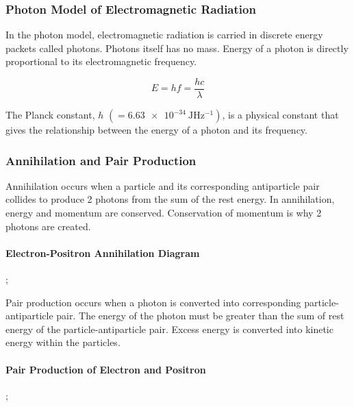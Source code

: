 \documentclass[10pt]{article}
\begin{document}
\begin{multicols*}{2}
	\subsubsection{Photon Model of Electromagnetic Radiation}
	In the photon model, electromagnetic radiation is carried in discrete energy
	packets called photons. Photons itself has no mass. Energy of a photon is
	directly proportional to its electromagnetic frequency.

	\begin{equation}
		E = hf = \dfrac{hc}{\lambda}
	\end{equation}

	The Planck constant, $h$ $(= \qty{6.63e-34}{\joule\hertz^{-1}})$, is a physical
	constant that gives the relationship between the energy of a photon and its
	frequency.

	\subsubsection{Annihilation and Pair Production}
	Annihilation occurs when a particle and its corresponding antiparticle pair
	collides to produce 2 photons from the sum of the rest energy. In annihilation,
	energy and momentum are conserved. Conservation of momentum is why 2 photons are
	created.
	\paragraph{Electron-Positron Annihilation Diagram}
	\begin{center}
		;
	\end{center}

	Pair production occurs when a photon is converted into corresponding
	particle-antiparticle pair. The energy of the photon must be greater than the
	sum of rest energy of the particle-antiparticle pair. Excess energy is converted
	into kinetic energy within the particles.
	\paragraph{Pair Production of Electron and Positron}
	\begin{center}
		;
	\end{center}


\end{multicols*}
\end{document}
